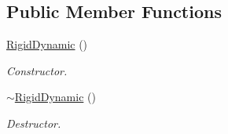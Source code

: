 \subsection*{Public Member Functions}
\begin{DoxyCompactItemize}
\item 
\hypertarget{classContent_1_1Actor_1_1Physics_1_1PhysX_1_1RigidDynamic_aad8bdffa6c5bc3746402ba219974320f}{
\hyperlink{classContent_1_1Actor_1_1Physics_1_1PhysX_1_1RigidDynamic_aad8bdffa6c5bc3746402ba219974320f}{RigidDynamic} ()}
\label{classContent_1_1Actor_1_1Physics_1_1PhysX_1_1RigidDynamic_aad8bdffa6c5bc3746402ba219974320f}

\begin{DoxyCompactList}\small\item\em Constructor. \item\end{DoxyCompactList}\item 
\hypertarget{classContent_1_1Actor_1_1Physics_1_1PhysX_1_1RigidDynamic_a2223efaea3c2cb9d5990326d042159b4}{
\hyperlink{classContent_1_1Actor_1_1Physics_1_1PhysX_1_1RigidDynamic_a2223efaea3c2cb9d5990326d042159b4}{$\sim$RigidDynamic} ()}
\label{classContent_1_1Actor_1_1Physics_1_1PhysX_1_1RigidDynamic_a2223efaea3c2cb9d5990326d042159b4}

\begin{DoxyCompactList}\small\item\em Destructor. \item\end{DoxyCompactList}\end{DoxyCompactItemize}
